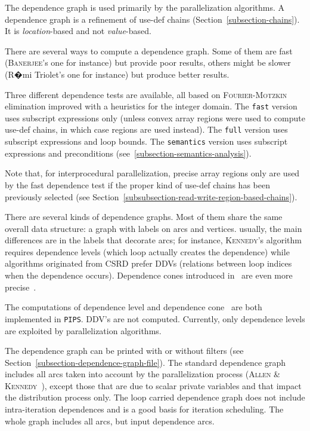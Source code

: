 \documentclass[a4paper]{report}
\newenvironment{PipsPass}[1]{\label{pass:#1}}{}
\newcommand{\Pips}{\texttt{PIPS}}
\begin{document}
\begin{PipsPass}{dg}
The dependence graph is used primarily by the parallelization
algorithms. A dependence graph is a refinement of use-def chains
(Section~\ref{subsection-chains}). It is {\em location}-based and not
{\em value}-based.

There are several ways to compute a dependence graph. Some of them are
fast (\textsc{Banerjee}'s one for instance) but provide poor results, others
might be slower (R�mi Triolet's one for instance) but produce better
results.

Three different dependence tests are available, all based on
\textsc{Fourier}-\textsc{Motzkin} elimination improved with a
heuristics for the integer domain. The \verb+fast+ version uses
subscript expressions only (unless convex array regions were used to compute
use-def chains, in which case regions are used instead). The
\verb+full+ version uses subscript expressions and loop bounds. The
\verb+semantics+ version uses subscript expressions and preconditions
(see~\ref{subsection-semantics-analysis}).

Note that, for interprocedural parallelization, precise array regions
only are used by the fast dependence test if the proper kind of
use-def chains has been previously selected (see
Section~\ref{subsubsection-read-write-region-based-chains}).

There are several kinds of dependence graphs. Most of them share the
same overall data structure: a graph with labels on arcs and vertices.
usually, the main differences are in the labels that decorate arcs;
for instance, \textsc{Kennedy}'s algorithm requires dependence levels (which
loop actually creates the dependence) while algorithms originated from
CSRD prefer DDVs (relations between loop indices when the dependence
occurs). Dependence cones introduced in~\cite{Iri87,IT87a,IT87b,IT88}
are even more precise~\cite{AIY94}.

The computations of dependence level and dependence cone~\cite{Yan93} are
both implemented in \Pips{}. DDV's are not computed. Currently, only
dependence levels are exploited by parallelization algorithms.

The dependence graph can be printed with or without filters (see
Section~\ref{subsection-dependence-graph-file}). The standard
dependence graph includes all arcs taken into account by the
parallelization process (\textsc{Allen} \&
\textsc{Kennedy}~\cite{AK87}), except those that are due to scalar
private variables and that impact the distribution process only. The
loop carried dependence graph does not include intra-iteration
dependences and is a good basis for iteration scheduling. The whole
graph includes all arcs, but input dependence arcs.


\end{PipsPass}
\end{document}
